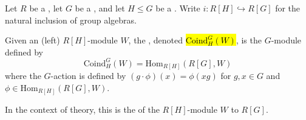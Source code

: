 \begin{definition} \label{definition:coinduction_of_a_group_module_over_a_ring_to_a_supergroup}
    Let $R$ be a , let $G$ be a , and let $H \leq G$ be a . Write $i: R[H] \hookrightarrow R[G]$ for the natural inclusion of group algebras.

    Given an (left) $R[H]$-module $W$, the , denoted \hl{$\text{Coind}^G_H(W)$}, is the $G$-module defined by
    $$\text{Coind}^G_H(W) = \text{Hom}_{R[H]}(R[G], W)$$
    where the $G$-action is defined by $(g \cdot \phi)(x) = \phi(xg)$ for $g, x \in G$ and $\phi \in \text{Hom}_{R[H]}(R[G], W)$. 

    In the context of  theory, this is the  of the $R[H]$-module $W$ to $R[G]$.
\end{definition}